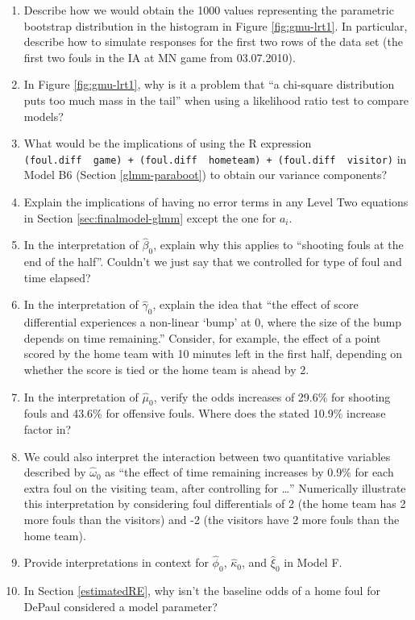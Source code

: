 \documentclass[
]{krantz}
\begin{document}
\begin{enumerate}
\item
  Describe how we would obtain the 1000 values representing the parametric bootstrap distribution in the histogram in Figure \ref{fig:gmu-lrt1}. In particular, describe how to simulate responses for the first two rows of the data set (the first two fouls in the IA at MN game from 03.07.2010).
\item
  In Figure \ref{fig:gmu-lrt1}, why is it a problem that ``a chi-square distribution puts too much mass in the tail'' when using a likelihood ratio test to compare models?
\item
  What would be the implications of using the R expression \texttt{(foul.diff\ \textbar{}\ game)\ +\ (foul.diff\ \textbar{}\ hometeam)\ +\ (foul.diff\ \textbar{}\ visitor)} in Model B6 (Section \ref{glmm-paraboot}) to obtain our variance components?
\item
  Explain the implications of having no error terms in any Level Two equations in Section \ref{sec:finalmodel-glmm} except the one for \(a_{i}\).
\item
  In the interpretation of \(\hat{\beta}_{0}\), explain why this applies to ``shooting fouls at the end of the half''. Couldn't we just say that we controlled for type of foul and time elapsed?
\item
  In the interpretation of \(\hat{\gamma}_{0}\), explain the idea that ``the effect of score differential experiences a non-linear `bump' at 0, where the size of the bump depends on time remaining.'' Consider, for example, the effect of a point scored by the home team with 10 minutes left in the first half, depending on whether the score is tied or the home team is ahead by 2.
\item
  In the interpretation of \(\hat{\mu}_{0}\), verify the odds increases of 29.6\% for shooting fouls and 43.6\% for offensive fouls. Where does the stated 10.9\% increase factor in?
\item
  We could also interpret the interaction between two quantitative variables described by \(\hat{\omega}_{0}\) as ``the effect of time remaining increases by 0.9\% for each extra foul on the visiting team, after controlling for \ldots{}'' Numerically illustrate this interpretation by considering foul differentials of 2 (the home team has 2 more fouls than the visitors) and -2 (the visitors have 2 more fouls than the home team).
\item
  Provide interpretations in context for \(\hat{\phi}_{0}\), \(\hat{\kappa}_{0}\), and \(\hat{\xi}_{0}\) in Model F.
\item
  In Section \ref{estimatedRE}, why isn't the baseline odds of a home foul for DePaul considered a model parameter?
\end{enumerate}
\end{document}
